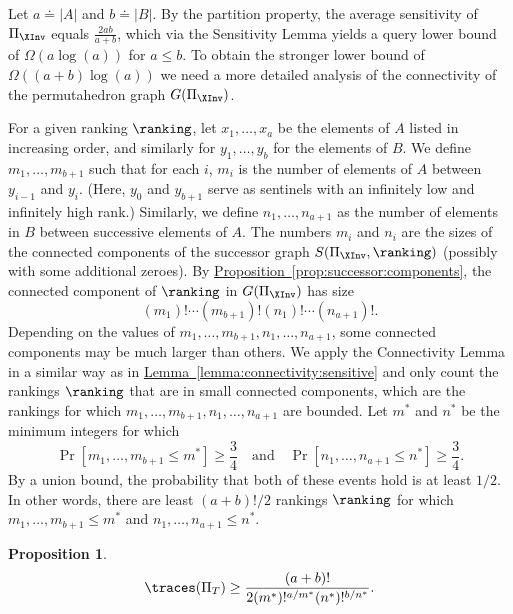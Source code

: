 \documentclass[11pt]{article}
\numberwithin{equation}{section}
\newtheorem{proposition}[theorem]{Proposition}
\theoremstyle{definition}
\theoremstyle{plain}
\newcommand{\expref}[2]{\hyperref[#2]{#1~\ref{#2}}}
\begin{document}
Let $a\doteq |A|$ and $b\doteq |B|$. By the partition property, the average sensitivity of $\Pi_{\XInv}$ equals $\frac{2ab}{a+b}$, which via the Sensitivity Lemma yields a query lower bound of $\Omega(a \log(a))$ for $a \le b$. To obtain the stronger lower bound of $\Omega((a+b)\log(a))$ we need a more detailed analysis of the connectivity of the permutahedron graph $G(\Pi_{\XInv})$. 

For a given ranking $\ranking$, let $x_1,\dots,x_{a}$ be the elements of $A$ listed in increasing order, and similarly for $y_1,\dots,y_b$ for the elements of $B$. We define $m_1,\dots,m_{b+1}$ such that for each $i$, $m_i$ is the number of elements of $A$ between $y_{i-1}$ and $y_i$. (Here, $y_0$ and $y_{b+1}$ serve as sentinels with an infinitely low and infinitely high rank.) Similarly, we define $n_1,\dots,n_{a+1}$ as the number of elements in $B$ between successive elements of $A$. The numbers $m_i$ and $n_i$ are the sizes of the connected components of the successor graph $S(\Pi_{\XInv},\ranking)$ (possibly with some additional zeroes). By \expref{Proposition}{prop:successor:components}, the connected component of $\ranking$ in $G(\Pi_{\XInv})$ has size
\begin{equation}
    \label{eq:mann-whitney:cc-size}
    (m_1)!\cdots (m_{b+1})!(n_1)!\cdots (n_{a+1})!.
\end{equation}
Depending on the values of $m_1,\dots,m_{b+1},n_1,\dots,n_{a+1}$, some connected components may be much larger than others. We apply the Connectivity Lemma in a similar way as in \expref{Lemma}{lemma:connectivity:sensitive} and only count the rankings $\ranking$ that are in small connected components, which are the rankings for which $m_1,\dots,m_{b+1},n_1,\dots,n_{a+1}$ are bounded. Let $m^*$ and $n^*$ be the minimum integers for which 
\begin{equation*}
    \Pr[m_1,\dots,m_{b+1} \le m^*] \ge \frac{3}{4}\quad\text{and}\quad
    \Pr[n_1,\dots,n_{a+1} \le n^*] \ge \frac{3}{4}.
\end{equation*}
By a union bound, the probability that both of these events hold is at least $1/2$. In other words, there are least $(a+b)!/2$ rankings $\ranking$ for which $m_1,\dots,m_{b+1}\le m^*$ and $n_1,\dots,n_{a+1}\le n^*$.
\begin{proposition}\label{prop:mann-whitney:cc-bound}
    \begin{equation}\label{eq:mann-whitney:cc-bound}
        \traces(\Pi_T) \ge \frac{(a+b)!}{2(m^*)!^{a/m^*}(n^*)!^{b/n^*}}.
    \end{equation}
\end{proposition}
\end{document}
